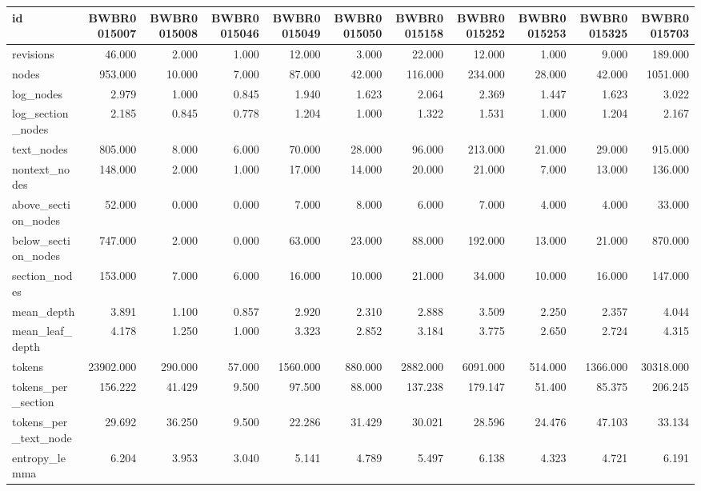 \begin{tabular}{lrrrrrrrrrr}
\toprule
id & BWBR0015007 & BWBR0015008 & BWBR0015046 & BWBR0015049 & BWBR0015050 & BWBR0015158 & BWBR0015252 & BWBR0015253 & BWBR0015325 & BWBR0015703 \\
\midrule
revisions & 46.000 & 2.000 & 1.000 & 12.000 & 3.000 & 22.000 & 12.000 & 1.000 & 9.000 & 189.000 \\
\cline{1-11}
nodes & 953.000 & 10.000 & 7.000 & 87.000 & 42.000 & 116.000 & 234.000 & 28.000 & 42.000 & 1051.000 \\
\cline{1-11}
log\_nodes & 2.979 & 1.000 & 0.845 & 1.940 & 1.623 & 2.064 & 2.369 & 1.447 & 1.623 & 3.022 \\
\cline{1-11}
log\_section\_nodes & 2.185 & 0.845 & 0.778 & 1.204 & 1.000 & 1.322 & 1.531 & 1.000 & 1.204 & 2.167 \\
\cline{1-11}
text\_nodes & 805.000 & 8.000 & 6.000 & 70.000 & 28.000 & 96.000 & 213.000 & 21.000 & 29.000 & 915.000 \\
\cline{1-11}
nontext\_nodes & 148.000 & 2.000 & 1.000 & 17.000 & 14.000 & 20.000 & 21.000 & 7.000 & 13.000 & 136.000 \\
\cline{1-11}
above\_section\_nodes & 52.000 & 0.000 & 0.000 & 7.000 & 8.000 & 6.000 & 7.000 & 4.000 & 4.000 & 33.000 \\
\cline{1-11}
below\_section\_nodes & 747.000 & 2.000 & 0.000 & 63.000 & 23.000 & 88.000 & 192.000 & 13.000 & 21.000 & 870.000 \\
\cline{1-11}
section\_nodes & 153.000 & 7.000 & 6.000 & 16.000 & 10.000 & 21.000 & 34.000 & 10.000 & 16.000 & 147.000 \\
\cline{1-11}
mean\_depth & 3.891 & 1.100 & 0.857 & 2.920 & 2.310 & 2.888 & 3.509 & 2.250 & 2.357 & 4.044 \\
\cline{1-11}
mean\_leaf\_depth & 4.178 & 1.250 & 1.000 & 3.323 & 2.852 & 3.184 & 3.775 & 2.650 & 2.724 & 4.315 \\
\cline{1-11}
tokens & 23902.000 & 290.000 & 57.000 & 1560.000 & 880.000 & 2882.000 & 6091.000 & 514.000 & 1366.000 & 30318.000 \\
\cline{1-11}
tokens\_per\_section & 156.222 & 41.429 & 9.500 & 97.500 & 88.000 & 137.238 & 179.147 & 51.400 & 85.375 & 206.245 \\
\cline{1-11}
tokens\_per\_text\_node & 29.692 & 36.250 & 9.500 & 22.286 & 31.429 & 30.021 & 28.596 & 24.476 & 47.103 & 33.134 \\
\cline{1-11}
entropy\_lemma & 6.204 & 3.953 & 3.040 & 5.141 & 4.789 & 5.497 & 6.138 & 4.323 & 4.721 & 6.191 \\

\end{tabular}
